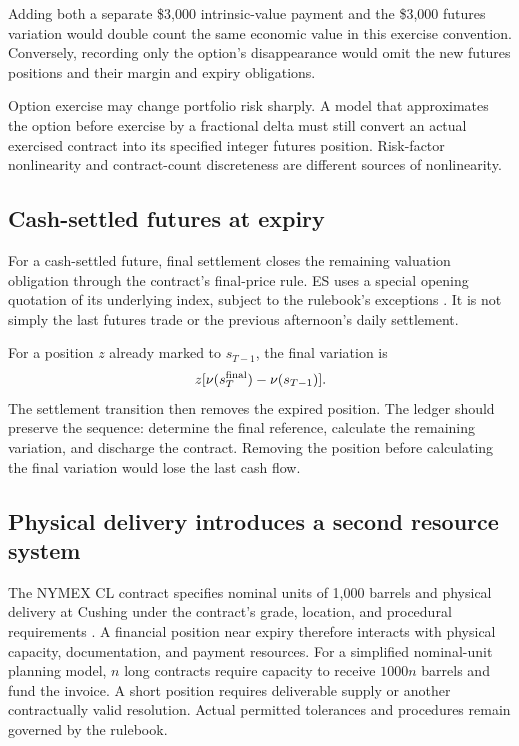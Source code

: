 Adding both a separate \$3,000 intrinsic-value payment and the \$3,000 futures variation would double count the same economic value in this exercise convention. Conversely, recording only the option's disappearance would omit the new futures positions and their margin and expiry obligations.

Option exercise may change portfolio risk sharply. A model that approximates the option before exercise by a fractional delta must still convert an actual exercised contract into its specified integer futures position. Risk-factor nonlinearity and contract-count discreteness are different sources of nonlinearity.

\subsection{Cash-settled futures at expiry}

For a cash-settled future, final settlement closes the remaining valuation obligation through the contract's final-price rule. ES uses a special opening quotation of its underlying index, subject to the rulebook's exceptions \citep{CME358}. It is not simply the last futures trade or the previous afternoon's daily settlement.

For a position $z$ already marked to $s_{T-1}$, the final variation is
\begin{equation}
 z[\nu(s_T^{\rm final})-\nu(s_{T-1})].
\end{equation}
The settlement transition then removes the expired position. The ledger should preserve the sequence: determine the final reference, calculate the remaining variation, and discharge the contract. Removing the position before calculating the final variation would lose the last cash flow.

\subsection{Physical delivery introduces a second resource system}

The NYMEX CL contract specifies nominal units of 1,000 barrels and physical delivery at Cushing under the contract's grade, location, and procedural requirements \citep{NYMEX200}. A financial position near expiry therefore interacts with physical capacity, documentation, and payment resources. For a simplified nominal-unit planning model, $n$ long contracts require capacity to receive $1000n$ barrels and fund the invoice. A short position requires deliverable supply or another contractually valid resolution. Actual permitted tolerances and procedures remain governed by the rulebook.


